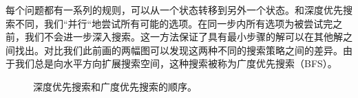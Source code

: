 \documentclass[UTF8]{article}
\begin{document}
每个问题都有一系列的规则，可以从一个状态转移到另外一个状态。和深度优先搜索不同，我们“并行“地尝试所有可能的选项。在同一步内所有选项为被尝试完之前，我们不会进一步深入搜索。这一方法保证了具有最小步骤的解可以在其他解之间找出。对比我们此前画的两幅图可以发现这两种不同的搜索策略之间的差异。由于我们总是向水平方向扩展搜索空间，这种搜索被称为广度优先搜索（BFS）。

\begin{figure}[htbp]
 \centering
 \caption{深度优先搜索和广度优先搜索的顺序。}
 \label{fig:dfs-bfs-tree}
\end{figure}
\end{document}
